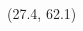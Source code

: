 \documentclass[final]{beamer}
\begin{document}
\begin{frame}{}
\begin{textblock}{25.2}
      \end{textblock}
  
      \begin{textblock}{25.2}(27.4, 62.1)
        \small
          


\end{textblock}
\end{frame}
\end{document}
